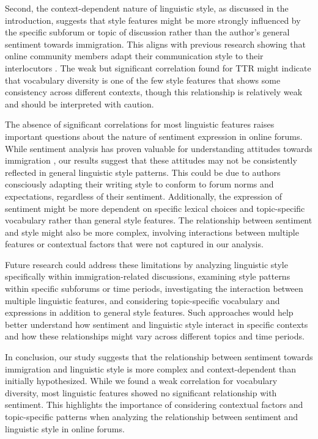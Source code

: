 \documentclass[11pt]{article}
\begin{document}
Second, the context-dependent nature of linguistic style, as discussed in the introduction, suggests that style features might be more strongly influenced by the specific subforum or topic of discussion rather than the author's general sentiment towards immigration.
This aligns with previous research showing that online community members adapt their communication style to their interlocutors \citep{DanescuNiculescuMizil2013}.
The weak but significant correlation found for TTR might indicate that vocabulary diversity is one of the few style features that shows some consistency across different contexts, though this relationship is relatively weak and should be interpreted with caution.

The absence of significant correlations for most linguistic features raises important questions about the nature of sentiment expression in online forums.
While sentiment analysis has proven valuable for understanding attitudes towards immigration \citep{Berdicevskis2023}, our results suggest that these attitudes may not be consistently reflected in general linguistic style patterns.
This could be due to authors consciously adapting their writing style to conform to forum norms and expectations, regardless of their sentiment.
Additionally, the expression of sentiment might be more dependent on specific lexical choices and topic-specific vocabulary rather than general style features.
The relationship between sentiment and style might also be more complex, involving interactions between multiple features or contextual factors that were not captured in our analysis.

Future research could address these limitations by analyzing linguistic style specifically within immigration-related discussions, examining style patterns within specific subforums or time periods, investigating the interaction between multiple linguistic features, and considering topic-specific vocabulary and expressions in addition to general style features.
Such approaches would help better understand how sentiment and linguistic style interact in specific contexts and how these relationships might vary across different topics and time periods.

In conclusion, our study suggests that the relationship between sentiment towards immigration and linguistic style is more complex and context-dependent than initially hypothesized.
While we found a weak correlation for vocabulary diversity, most linguistic features showed no significant relationship with sentiment.
This highlights the importance of considering contextual factors and topic-specific patterns when analyzing the relationship between sentiment and linguistic style in online forums.



\appendix
\end{document}

